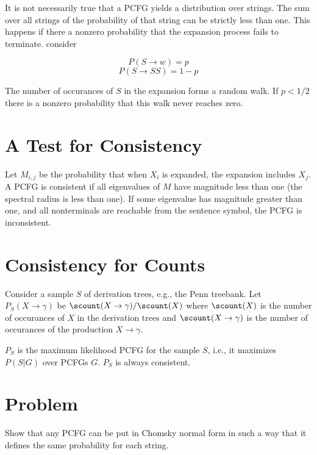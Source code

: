 It is not necessarily true that a PCFG yields a distribution over strings.
The sum over all strings of the probability of that string can be strictly less than one.
This happens if there a nonzero probability that the expansion process fails to terminate.
consider

$$P(S \rightarrow w) = p$$
$$P(S \rightarrow SS) = 1-p$$


The number of occurances of $S$ in the expansion forms a random walk.  If $p < 1/2$ there is a nonzero probability that this walk never reaches zero.

\section{A Test for Consistency}

Let $M_{i,j}$ be the probability that when $X_i$ is expanded, the
expansion includes $X_j$.  A PCFG is consistent if all eigenvalues of
$M$ have magnitude less than one (the spectral radius is less than
one).  If some eigenvalue has magnitude greater than one, and all
nonterminals are reachable from the sentence symbol, the PCFG is
inconsistent.

\section{Consistency for Counts}

Consider a sample $S$ of derivation trees, e.g., the Penn treebank.  Let $P_S(X\rightarrow\gamma)$ be $\scount(X\rightarrow\gamma)/\scount(X)$
where $\scount(X)$ is the number of occurances of $X$ in the derivation trees and $\scount(X\rightarrow \gamma)$ is the number of occurances of the production $X\rightarrow \gamma$.


$P_S$ is the maximum likelihood PCFG for the sample $S$, i.e., it maximizes $P(S|G)$ over PCFGs $G$.
$P_S$ is always consistent.


\section{Problem}

Show that any PCFG can be put in Chomsky normal form in such a way that it defines
the same probability for each string.

